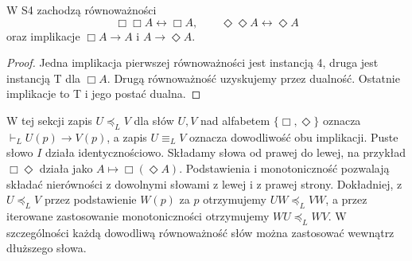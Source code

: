 \begin{lemat}
\label{lem:ncl-modal-S4-idempotence}
W S4 zachodzą równoważności
\[
 \Box\Box A\leftrightarrow\Box A,\qquad
 \Diamond\Diamond A\leftrightarrow\Diamond A
\]
oraz implikacje $\Box A\to A$ i $A\to\Diamond A$.
\end{lemat}
\begin{proof}
Jedna implikacja pierwszej równoważności
jest instancją 4, druga jest instancją T dla $\Box A$.
Drugą równoważność uzyskujemy przez dualność.
Ostatnie implikacje to T i jego postać dualna.
\end{proof}
W tej sekcji zapis $U\preceq_L V$ dla słów
$U,V$ nad alfabetem $\{\Box,\Diamond\}$ oznacza
$\vdash_L U(p)\to V(p)$, a zapis $U\equiv_L V$
oznacza dowodliwość obu implikacji.
Puste słowo $I$ działa identycznościowo.
Składamy słowa od prawej do lewej, na przykład
$\Box\Diamond$ działa jako $A\mapsto\Box(\Diamond A)$.
Podstawienia i monotoniczność pozwalają
składać nierówności z dowolnymi słowami
z lewej i z prawej strony. Dokładniej,
z $U\preceq_L V$ przez podstawienie $W(p)$ za $p$
otrzymujemy $UW\preceq_L VW$, a przez
iterowane zastosowanie monotoniczności
otrzymujemy $WU\preceq_L WV$. W szczególności
każdą dowodliwą równoważność słów można
zastosować wewnątrz dłuższego słowa.


